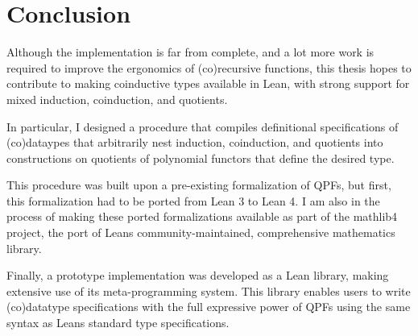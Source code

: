 
\chapter{Conclusion}
\label{ch:conclusion}

Although the implementation is far from complete, and a lot more work is required to improve the ergonomics of (co)recursive functions, this thesis hopes to contribute to making coinductive types available in Lean, with strong support for mixed induction, coinduction, and quotients. 

In particular, I designed a procedure that compiles definitional specifications of (co)dataypes
that arbitrarily nest induction, coinduction, and quotients into constructions on quotients of polynomial functors that define the desired type.

This procedure was built upon a pre-existing formalization of QPFs, but first,
this formalization had to be ported from Lean 3 to Lean 4. I am also in the process of making
these ported formalizations available as part of the mathlib4 project, the port of Leans community-maintained, comprehensive mathematics library.

Finally, a prototype implementation was developed as a Lean library, making extensive use of its meta-programming system.
This library enables users to write (co)datatype specifications with the full expressive power of QPFs using the
same syntax as Leans standard \inductive{} type specifications.